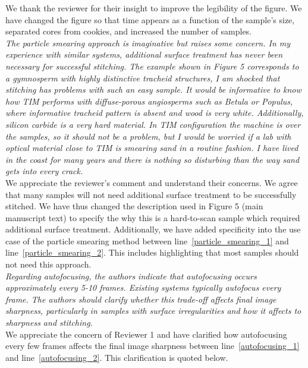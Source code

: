 \documentclass[12pt,a4paper]{article}
\newcommand{\lr}[1]{line~\ref{#1}}
\begin{document}
We thank the reviewer for their insight to improve the legibility of the figure. We have changed the figure so that time appears as a function of the sample's size, separated cores from cookies, and increased the number of samples. \\

\emph{The particle smearing approach is imaginative but raises some concern. In my experience with similar systems, additional surface treatment has never been necessary for successful stitching. The example shown in Figure 5 corresponds to a gymnosperm with highly distinctive tracheid structures, I am shocked that stitching has problems with such an easy sample. It would be informative to know how TIM performs with diffuse-porous angiosperms such as Betula or Populus, where informative tracheid pattern is absent and wood is very white. Additionally, silicon carbide is a very hard material. In TIM configuration the machine is over the samples, so it should not be a problem, but I would be worried if a lab with optical material close to TIM is smearing sand in a routine fashion. I have lived in the coast for many years and there is nothing so disturbing than the way sand gets into every crack.}\\

We appreciate the reviewer's comment and understand their concerns. We agree that many samples will not need additional surface treatment to be successfully stitched. We have thus changed the description used in Figure 5 (main manuscript text) to specify the why this is a hard-to-scan sample which required additional surface treatment. Additionally, we have added specificity into the use case of the particle smearing method between \lr{particle_smearing_1} and \lr{particle_smearing_2}. This includes highlighting that most samples should not need this approach. \\

\emph{Regarding autofocusing, the authors indicate that autofocusing occurs approximately every 5-10 frames. Existing systems typically autofocus every frame. The authors should clarify whether this trade-off affects final image sharpness, particularly in samples with surface irregularities and how it affects to sharpness and stitching.} \\

We appreciate the concern of Reviewer 1 and have clarified how autofocusing every few frames affects the final image sharpness between \lr{autofocusing_1} and \lr{autofocusing_2}. This clarification is quoted below. \\
\end{document}
